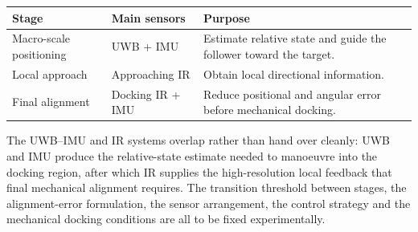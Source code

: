 \documentclass[11pt,a4paper]{article}
\newif\ifreview
\newcommand{\pending}[1]{\ifreview{\color{blue}#1}\else#1\fi}
\newenvironment{pblock}{\ifreview\color{blue}\fi}{}
\newcounter{gsec}
\newcounter{gsub}
\newcommand{\curgsec}{}
\newcommand{\gsep}{\texorpdfstring{\quad}{ }}
\newcommand{\gtocsub}[2]{%
  \phantomsection
  \addcontentsline{toc}{subsection}{#1\gsep #2}%
}
\newcommand{\gsubsection}[1]{%
  \refstepcounter{gsub}%
  \edef\gsublbl{\curgsec.\thegsub}%
  \expandafter\gtocsub\expandafter{\gsublbl}{#1}%
  \subsection*{\gsublbl\quad #1}%
}
\begin{document}
\begin{pblock}
\begin{longtable}{@{}L{0.24\textwidth} L{0.22\textwidth} L{0.46\textwidth}@{}}
\toprule
\textbf{Stage} & \textbf{Main sensors} & \textbf{Purpose} \\
\midrule
\endhead
Macro-scale positioning & UWB + IMU &
  Estimate relative state and guide the follower toward the target. \\
Local approach & Approaching IR &
  Obtain local directional information. \\
Final alignment & Docking IR + IMU &
  Reduce positional and angular error before mechanical docking. \\
\bottomrule
\end{longtable}
\end{pblock}

\pending{%
\noindent The UWB--IMU and IR systems overlap rather than hand over cleanly:
UWB and IMU produce the relative-state estimate needed to manoeuvre into the
docking region, after which IR supplies the high-resolution local feedback
that final mechanical alignment requires. The transition threshold between
stages, the alignment-error formulation, the sensor arrangement, the control
strategy and the mechanical docking conditions are all to be fixed
experimentally.
}

\pending{}
\end{document}
